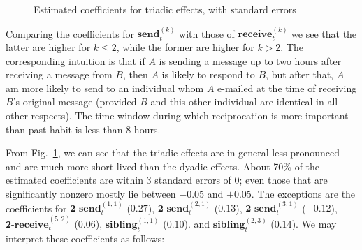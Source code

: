 \documentclass[final]{statsoc}
\begin{document}
\begin{figure}
  \centering
  \caption{Estimated coefficients for triadic effects, with standard errors}
  \label{F:enron-triad}
\end{figure}

Comparing the coefficients for $\textbf{send}_t^{(k)}$ with those of
$\textbf{receive}_t^{(k)}$ we see that the latter are higher for $k \leq 2$,
while the former are higher for $k > 2$.  The corresponding intuition is that if $A$ is
sending a message up to two hours after receiving a message from $B$, then $A$
is likely to respond to $B$, but after that, $A$ am more likely to send to an individual
whom $A$ e-mailed at the time of receiving $B$'s original message (provided
$B$ and this other individual are identical in all other respects).  The time window
during which reciprocation is more important than past habit is less than 8 hours.

From Fig.~\ref{F:enron-triad}, we can see that the triadic effects are in general less
pronounced and are much more short-lived than the dyadic effects.  About
70\% of the estimated coefficients are within $3$ standard errors of
$0$; even those that are significantly nonzero mostly lie between $-0.05$ and
$+0.05$.  The exceptions are the coefficients for
$\textbf{2-send}_t^{(1,1)}$ ($0.27$),
$\textbf{2-send}_t^{(2,1)}$ ($0.13$),
$\textbf{2-send}_t^{(3,1)}$ ($-0.12$),
$\textbf{2-receive}_t^{(5,2)}$ ($0.06$),
$\textbf{sibling}_t^{(1,1)}$ ($0.10$).
and
$\textbf{sibling}_t^{(2,3)}$ ($0.14$).  We may interpret these coefficients as follows:
\end{document}

